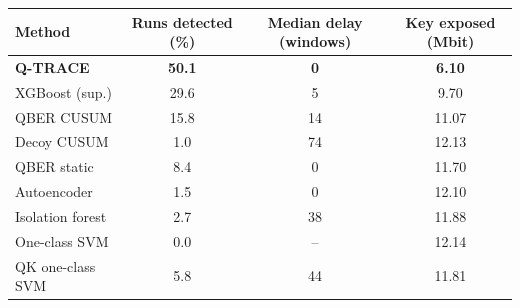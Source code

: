\begin{tabular}{lccc}
\toprule
Method & Runs detected (\%) & Median delay (windows) & Key exposed (Mbit) \\
\midrule
\textbf{Q-TRACE} & \textbf{50.1} & \textbf{0} & \textbf{6.10} \\
XGBoost (sup.) & 29.6 & 5 & 9.70 \\
QBER CUSUM & 15.8 & 14 & 11.07 \\
Decoy CUSUM & 1.0 & 74 & 12.13 \\
QBER static & 8.4 & 0 & 11.70 \\
Autoencoder & 1.5 & 0 & 12.10 \\
Isolation forest & 2.7 & 38 & 11.88 \\
One-class SVM & 0.0 & -- & 12.14 \\
QK one-class SVM & 5.8 & 44 & 11.81 \\
\bottomrule
\end{tabular}
